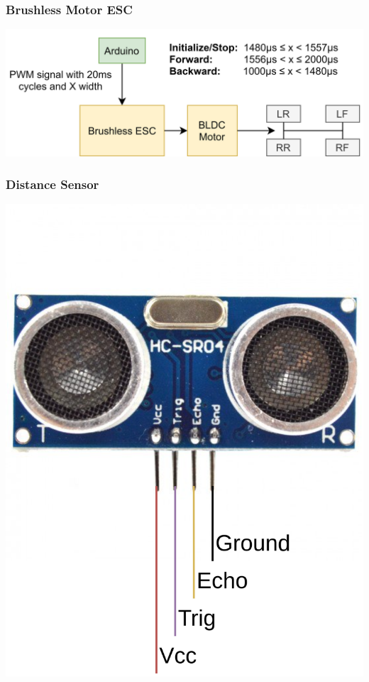 \documentclass{beamer}
\begin{document}
    \begin{frame}
        \frametitle{Brushless Motor ESC}
        \includegraphics[width=\linewidth]{img/brushless-motor-esc}
    \end{frame}

    \begin{frame}
        \frametitle{Distance Sensor}
        \centering
        \includegraphics[scale=0.08]{img/hcsr04.png}
    \end{frame}
\end{document}

